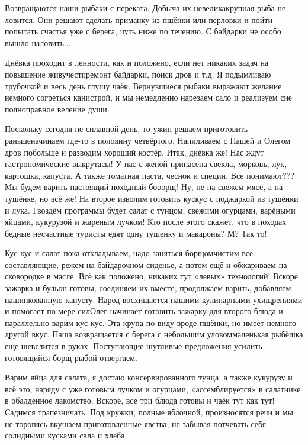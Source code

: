 Возвращаются наши рыбаки с переката. Добыча их невелика\mdash крупная рыба не ловится. Они решают сделать приманку из пшёнки или перловки и пойти попытать счастья уже с берега, чуть ниже по течению. С байдарки не особо вышло наловить$\ldots$

Днёвка проходит в ленности, как и положено, если нет никаких задач на повышение живучести\mdash ремонт байдарки, поиск дров и т.д. Я подымливаю трубочкой и весь день глушу чаёк. Вернувшиеся рыбаки выражают желание немного согреться канистрой, и мы немедленно нарезаем сало и реализуем сие полноправное веление души.

Поскольку сегодня не сплавной день, то ужин решаем приготовить раньше\mdash начинаем где-то в половину четвёртого. Напиливаем с Пашей и Олегом дров побольше и разводим хороший костёр. Итак, днёвка же! Нас ждут гастрономические выкрутасы! У нас с женой припасена свекла, морковь, лук, картошка, капуста. А также томатная паста, чеснок и специи. Все понимают??? Мы будем варить настоящий походный бо\sdash о\sdash о\sdash рщ! Ну, не на свежем мясе, а на тушёнке, но всё же! На второе изволим готовить кус\sdash кус с поджаркой из тушёнки и лука. Гвоздём программы будет салат с тунцом, свежими огурцами, варёными яйцами, кукурузой и жареным лучком! Кто после этого скажет, что в походах бедные несчастные туристы едят одну тушенку и макароны? М? Так то!

Кус-кус и салат пока откладываем, надо заняться борщом\mdash чистим все составляющие, режем на байдарочном сиденье, а потом ещё и обжариваем на сковородке в масле. Всё как положено, никаких тут «левых» технологий! Вскоре зажарка и бульон готовы, соединяем их вместе, продолжаем варить, добавляем нашинкованную капусту. Народ восхищается нашими кулинарными ухищрениями и помогает по мере сил\mdash Олег начинает готовить зажарку для второго блюда и параллельно варим кус-кус. Эта крупа по виду вроде пшёнки, но имеет немного другой вкус. Паша возвращается с берега с небольшим уловом\mdash маленькая рыбёшка еще шевелится в руках. Поступающие шутливые предложения усилить готовящийся борщ рыбой отвергаем. 

Варим яйца для салата, я достаю консервированного тунца, а также кукурузу и всё это, наряду с уже готовым лучком и огурцами, «ассемблируется» в салатнике в обалденное лакомство. Вскоре, все три блюда готовы и чаёк тут как тут! Садимся трапезничать. Под кружки, полные яблочной, произносятся речи и мы не торопясь вкушаем приготовленные явства, не забывая потчевать себя солидными кусками сала и хлеба. 

